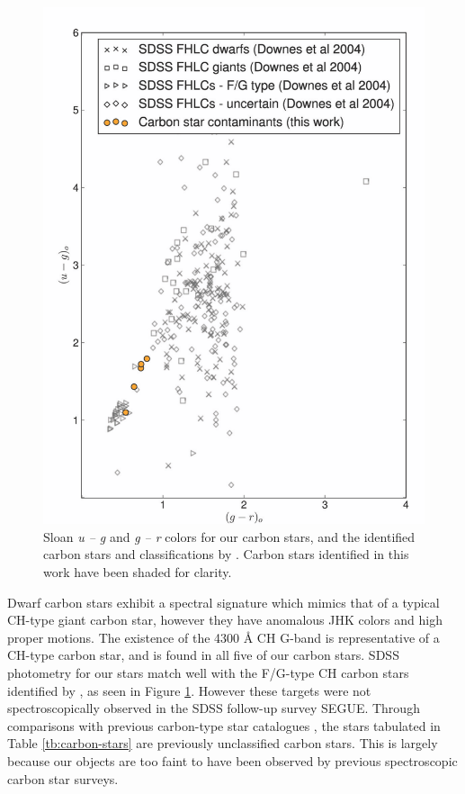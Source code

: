 \begin{figure}[h!]
	\includegraphics[width=\columnwidth]{chapter1/carbon_stars.pdf}
	\caption{Sloan \textit{u \--- g} and \textit{g \--- r} colors for our carbon stars, and the identified carbon stars and classifications by \citet{Downes;et-al_2004}. Carbon stars identified in this work have been shaded for clarity.}
	\label{fig:carbon-sdss}
\end{figure}

	 Dwarf carbon stars exhibit a spectral signature which mimics that of a typical CH-type giant carbon star, however they have anomalous JHK colors \citep{Green;et-al_1992} and high proper motions. The existence of the 4300 \AA{} CH G-band is representative of a CH-type carbon star, and is found in all five of our carbon stars. SDSS photometry for our stars match well with the F/G-type CH carbon stars identified by \citet{Downes;et-al_2004}, as seen in Figure \ref{fig:carbon-sdss}. However these targets were not spectroscopically observed in the SDSS follow-up survey SEGUE.  Through comparisons with previous carbon-type star catalogues \citep{Totten;Irwin_1998, Downes;et-al_2004, Goswami;et-al_2010}, the stars tabulated in Table \ref{tb:carbon-stars} are previously unclassified carbon stars. This is largely because our objects are too faint to have been observed by previous spectroscopic carbon star surveys.
	
